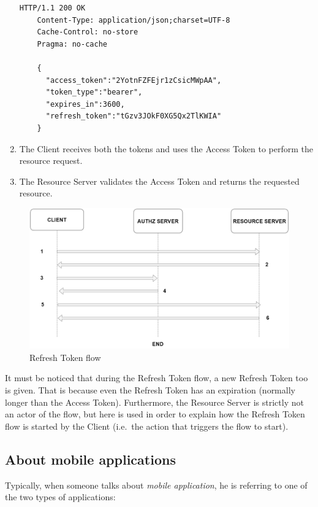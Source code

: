 \documentclass[a4paper,12pt]{article}
\def\ie{i.e.\xspace}
\begin{document}
\begin{enumerate}
    \begin{lstlisting}[basicstyle=\ttfamily]
    HTTP/1.1 200 OK
    Content-Type: application/json;charset=UTF-8
    Cache-Control: no-store
    Pragma: no-cache
    
    {
      "access_token":"2YotnFZFEjr1zCsicMWpAA",
      "token_type":"bearer",
      "expires_in":3600,
      "refresh_token":"tGzv3JOkF0XG5Qx2TlKWIA"
    }
    \end{lstlisting}
    
    \item The Client receives both the tokens and uses the Access Token to perform the resource request.
    \item The Resource Server validates the Access Token and returns the requested resource. 
\end{enumerate}

\begin{figure}[ht]
    \centering
    \includegraphics[width=\textwidth]{figures/refresh_token_general.png}
    \caption{Refresh Token flow}
    \label{fig:refreshtok}
\end{figure}


It must be noticed that during the Refresh Token flow, a new Refresh Token too is given. That is because even the Refresh Token has an expiration (normally longer than the Access Token).
Furthermore, the Resource Server is strictly not an actor of the flow, but here is used in order to explain how the Refresh Token flow is started by the Client (\ie\ the action that triggers the flow to start).

\subsection{About mobile applications}
Typically, when someone talks about \textit{mobile application}, he is referring to one of the two types of applications:
\end{document}
